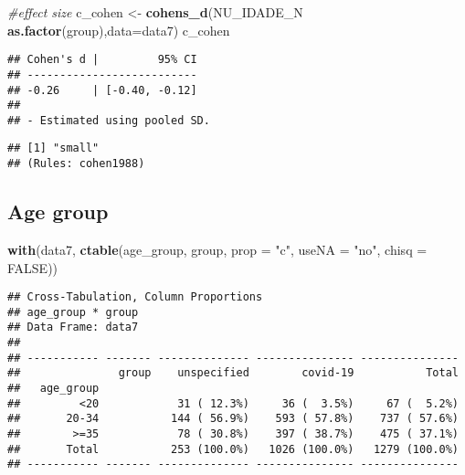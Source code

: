 \documentclass[
]{article}
\newenvironment{Shaded}{\begin{snugshade}}{\end{snugshade}}
\newcommand{\CommentTok}[1]{\textcolor[rgb]{0.56,0.35,0.01}{\textit{#1}}}
\newcommand{\DataTypeTok}[1]{\textcolor[rgb]{0.13,0.29,0.53}{#1}}
\newcommand{\KeywordTok}[1]{\textcolor[rgb]{0.13,0.29,0.53}{\textbf{#1}}}
\newcommand{\NormalTok}[1]{#1}
\newcommand{\OperatorTok}[1]{\textcolor[rgb]{0.81,0.36,0.00}{\textbf{#1}}}
\newcommand{\OtherTok}[1]{\textcolor[rgb]{0.56,0.35,0.01}{#1}}
\newcommand{\StringTok}[1]{\textcolor[rgb]{0.31,0.60,0.02}{#1}}
\begin{document}
\begin{Shaded}
\begin{Highlighting}[]
\CommentTok{#effect size}
\NormalTok{c_cohen <-}\StringTok{ }\KeywordTok{cohens_d}\NormalTok{(NU_IDADE_N }\OperatorTok{~}\StringTok{ }\KeywordTok{as.factor}\NormalTok{(group),}\DataTypeTok{data=}\NormalTok{data7)}
\NormalTok{c_cohen}
\end{Highlighting}
\end{Shaded}

\begin{verbatim}
## Cohen's d |         95% CI
## --------------------------
## -0.26     | [-0.40, -0.12]
## 
## - Estimated using pooled SD.
\end{verbatim}

\begin{Shaded}
\end{Shaded}

\begin{verbatim}
## [1] "small"
## (Rules: cohen1988)
\end{verbatim}

\hypertarget{age-group}{%
\subsection{Age group}\label{age-group}}

\begin{Shaded}
\begin{Highlighting}[]
\KeywordTok{with}\NormalTok{(data7, }\KeywordTok{ctable}\NormalTok{(age_group, group, }\DataTypeTok{prop =} \StringTok{"c"}\NormalTok{, }\DataTypeTok{useNA =} \StringTok{"no"}\NormalTok{, }\DataTypeTok{chisq =} \OtherTok{FALSE}\NormalTok{))}
\end{Highlighting}
\end{Shaded}

\begin{verbatim}
## Cross-Tabulation, Column Proportions  
## age_group * group  
## Data Frame: data7  
## 
## ----------- ------- -------------- --------------- ---------------
##               group    unspecified        covid-19           Total
##   age_group                                                       
##         <20            31 ( 12.3%)     36 (  3.5%)     67 (  5.2%)
##       20-34           144 ( 56.9%)    593 ( 57.8%)    737 ( 57.6%)
##        >=35            78 ( 30.8%)    397 ( 38.7%)    475 ( 37.1%)
##       Total           253 (100.0%)   1026 (100.0%)   1279 (100.0%)
## ----------- ------- -------------- --------------- ---------------
\end{verbatim}
\end{document}
